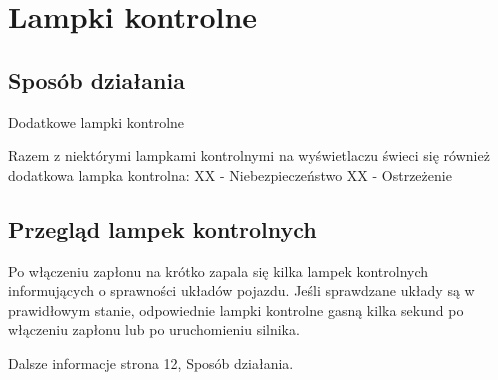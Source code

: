 \section{Lampki kontrolne}

\subsection{Sposób działania}

Dodatkowe lampki kontrolne

Razem z niektórymi lampkami kontrolnymi na wyświetlaczu świeci się również dodatkowa lampka kontrolna:
XX - Niebezpieczeństwo
XX - Ostrzeżenie

\subsection{Przegląd lampek kontrolnych}

Po włączeniu zapłonu na krótko zapala się kilka lampek kontrolnych informujących o sprawności układów pojazdu. Jeśli sprawdzane układy są w prawidłowym stanie, odpowiednie lampki kontrolne gasną kilka sekund po włączeniu zapłonu lub po uruchomieniu silnika.

Dalsze informacje \guillemotright strona 12, Sposób działania.


